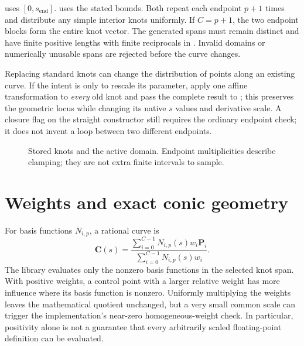  uses $[0,s_\mathrm{end}]$.
 uses the stated bounds. Both repeat
each endpoint $p+1$ times and distribute any simple interior knots uniformly.
If $C=p+1$, the two endpoint blocks form the entire knot vector. The generated
spans must remain distinct and have finite positive lengths with finite
reciprocals in . Invalid domains or numerically unusable spans are
rejected before the curve changes.

Replacing standard knots can change the distribution of points along an
existing curve. If the intent is only to rescale its parameter, apply one
affine transformation to \emph{every} old knot and pass the complete result
to ; this preserves the geometric locus while changing its
native $s$ values and derivative scale. A closure flag on the straight
constructor still requires the ordinary endpoint check; it does not invent a
loop between two different endpoints.

\begin{figure}[tbp]
\centering
{}
\caption{Stored knots and the active domain. Endpoint multiplicities describe
clamping; they are not extra finite intervals to sample.}
\label{fig:spline-knots}
\end{figure}

\section{Weights and exact conic geometry}

For basis functions $N_{i,p}$, a rational curve is
\begin{equation}
 \mathbf C(s)=\frac{\sum_{i=0}^{C-1}N_{i,p}(s)w_i\mathbf P_i}
                         {\sum_{i=0}^{C-1}N_{i,p}(s)w_i}.
\label{eq:rational-curve}
\end{equation}
The library evaluates only the nonzero basis functions in the selected knot
span. With positive weights, a control point with a larger relative weight
has more influence where its basis function is nonzero. Uniformly multiplying
the weights leaves the mathematical quotient unchanged, but a very small
common scale can trigger the implementation's near-zero homogeneous-weight
check. In particular, positivity alone is not a guarantee that every
arbitrarily scaled floating-point definition can be evaluated.

